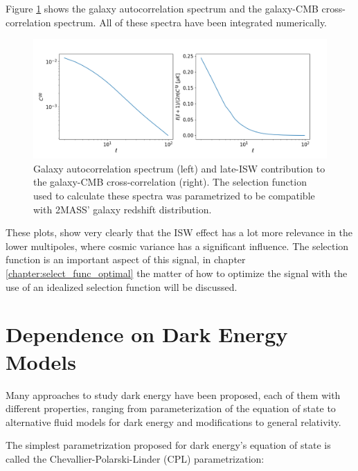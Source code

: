 \documentclass[openany,a4paper,12pt,oneside]{book}
\begin{document}
\begin{spacing}{1.5}
Figure \ref{fig:correlations_theoretical} shows the galaxy autocorrelation spectrum and the galaxy-CMB cross-correlation spectrum. All of these spectra have been integrated numerically.

\begin{figure}[!htb]
	\centering
	\includegraphics[width=.98\linewidth]{Imagens/Correlations_DoublePlot.png}
	\caption{Galaxy autocorrelation spectrum (left) and late-ISW contribution to the galaxy-CMB cross-correlation (right). The selection function used to calculate these spectra was parametrized to be compatible with 2MASS' galaxy redshift distribution\cite{cross_corr:Afshordi, Moura-Santos_2016}.}
	\label{fig:correlations_theoretical}
\end{figure}

These plots, show very clearly that the ISW effect has a lot more relevance in the lower multipoles, where cosmic variance has a significant influence. The selection function is an important aspect of this signal, in chapter \ref{chapter:select_func_optimal} the matter of how to optimize the signal with the use of an idealized selection function will be discussed.

\section{Dependence on Dark Energy Models}\label{sect:dark_energy}

Many approaches to study dark energy have been proposed, each of them with different properties, ranging from parameterization of the equation of state\cite{CPL_DE_parametrization, FSLL_DE_parametrization} to alternative fluid models for dark energy\cite{DEDM_fluid} and modifications to general relativity\cite{Brane_cosmo_model}. 

The simplest parametrization proposed for dark energy's equation of state is called the Chevallier-Polarski-Linder (CPL) parametrization\cite{CPL_DE_parametrization,DE_models}:


\end{spacing}
\end{document}
